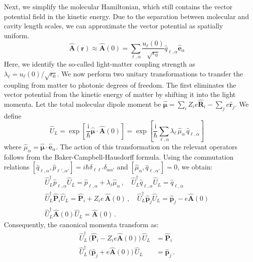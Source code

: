 Next, we simplify the molecular Hamiltonian, which still contains the vector potential field in the kinetic energy. 
Due to the separation between molecular and cavity length scales, we can approximate the vector potential as spatially uniform.
\begin{equation}
\hat{\bm A}(\bm r) \approx  \hat{\bm A}(0) =\sum_{\ell,\alpha}\frac{u_\ell(0)}{\sqrt{\epsilon_0}} \hat{q}_{\ell,\alpha}\hat{\bm e}_\alpha %
\end{equation}
Here, we identify the so-called light-matter coupling strength as $\lambda_\ell = u_\ell(0)/\sqrt{\epsilon_0}$. %
We now perform two unitary transformations to transfer the coupling from matter to photonic degrees of freedom.
The first eliminates the vector potential from the kinetic energy of matter by shifting it into the light momenta.
Let the total molecular dipole moment be $\hat{\bm \mu} = \sum_i Z_i e \hat{\bm R}_i - \sum_j e \hat{\bm r}_j$. We define
\begin{equation}
\hat{U}_L = \exp \left[\frac{\mathrm{i}}{\hbar}\hat{\bm \mu} \cdot \hat{\bm A}(0) \right] = \exp \left[\frac{\mathrm{i}}{\hbar} \sum_{\ell,\alpha} \lambda_\ell \,\hat{\mu}_\alpha \, \hat{q}_{\ell,\alpha} \right] 
\end{equation}
where $\hat{\mu}_\alpha = \hat{\bm\mu} \cdot \hat{\bm e}_\alpha$. The action of this transformation on the relevant operators follows from the Baker-Campbell-Hausdorff formula.
Using the commutation relations $[\hat{q}_{\ell,\alpha},\hat{p}_{\ell',\alpha'}]=i\hbar \delta_{\ell\ell'} \delta_{\alpha\alpha'}$ and $[\hat{\mu}_\alpha,\hat{q}_{\ell,\alpha'}]=0$, we obtain:
\begin{gather}
\hat{U}_{L}^{\dagger} \hat{p}_{\ell,\alpha} \hat{U}_{L} = \hat{p}_{\ell,\alpha} + \lambda_\ell \hat{\mu}_\alpha \,, \quad \hat{U}_{L}^{\dagger} \hat{q}_{\ell,\alpha} \hat{U}_{L} = \hat{q}_{\ell,\alpha} \\
\hat{U}_{L}^{\dagger} \hat{\bm P}_i \hat{U}_{L} = \hat{\bm P}_i + Z_i e\, \hat{\bm A}(0) \,, \quad \hat{U}_{L}^{\dagger} \hat{\bm p}_j\hat{U}_{L} = \hat{\bm p}_j - e \hat{\bm A}(0) \\
\hat{U}_{L}^{\dagger} \hat{\bm A}(0) \hat{U}_{L} = \hat{\bm A}(0) \,.
\end{gather}
Consequently, the canonical momenta transform as:
\begin{align}
\hat{U}_{L}^{\dagger}\, \big(\hat{\bm P}_i - Z_i e \hat{\bm A}(0)\big)\, \hat{U}_{L} &= \hat{\bm P}_i \\
\hat{U}_{L}^{\dagger}\, \big(\hat{\bm p}_j + e \hat{\bm A}(0)\big)\, \hat{U}_{L} &= \hat{\bm p}_j \,.
\end{align}
